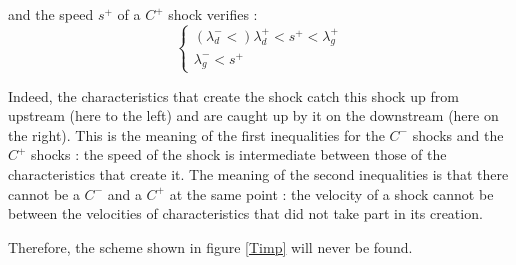 \vspace{0.5cm}

and the speed $s^+$ of a $C^+$ shock verifies :
\begin{equation}
  \left \lbrace
  \begin{array}{l}
    (\lambda_{d}^- < ) \lambda_{d}^+ < s^+ < \lambda_{g}^+  \\
    \lambda_{g}^- < s^+
  \end{array}
 \right.
\end{equation}

\vspace{0.5cm}

Indeed, the characteristics that create the shock catch this shock up from upstream (here to the left) and are caught up by it on the downstream (here on the right). This is the meaning of the first inequalities for the $C^-$ shocks and the $C^+$ shocks : the speed of the shock is intermediate between those of the characteristics that create it. The meaning of the second inequalities is that there cannot be a $C^-$ and a $C^+$ at the same point : the velocity of a shock cannot be between the velocities of characteristics that did not take part in its creation.

\vspace{0.5cm}

Therefore, the scheme shown in figure \ref{Timp} will never be found.

